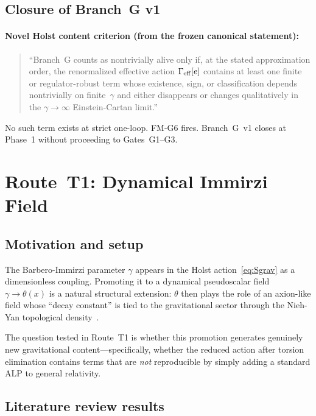 \documentclass[11pt,letterpaper]{article}
\newcommand{\BI}{\gamma}               %
\newcommand{\Gam}{\Gamma_{\rm eff}}
\begin{document}
\subsection{Closure of Branch~G v1}\label{sec:branchG_closure}

\paragraph{Novel Holst content criterion (from the frozen canonical
statement):}
\begin{quote}
``Branch~G counts as nontrivially alive only if, at the stated approximation
order, the renormalized effective action $\Gam[e]$ contains at least one
finite or regulator-robust term whose existence, sign, or classification
depends nontrivially on finite~$\BI$ and either disappears or changes
qualitatively in the $\BI\to\infty$ Einstein-Cartan limit.''
\end{quote}

No such term exists at strict one-loop. FM-G6 fires. Branch~G~v1 closes at
Phase~1 without proceeding to Gates~G1--G3.


\section{Route~T1: Dynamical Immirzi Field}\label{sec:T1}

\subsection{Motivation and setup}\label{sec:T1_setup}

The Barbero-Immirzi parameter $\BI$ appears in the Holst
action~\eqref{eq:Sgrav} as a dimensionless coupling. Promoting it to a
dynamical pseudoscalar field $\BI\to\theta(x)$ is a natural structural
extension: $\theta$ then plays the role of an axion-like field whose
``decay constant'' is tied to the gravitational sector through the Nieh-Yan
topological density~\cite{Mercuri2009}.

The question tested in Route~T1 is whether this promotion generates
genuinely new gravitational content---specifically, whether the reduced
action after torsion elimination contains terms that are \emph{not}
reproducible by simply adding a standard ALP to general relativity.

\subsection{Literature review results}\label{sec:T1_literature}
\end{document}
